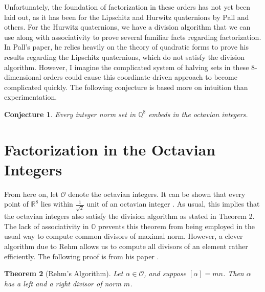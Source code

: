 \documentclass[10pt]{amsart}
\newcommand{\Q}{\mathbb{Q}}
\newcommand{\R}{\mathbb{R}}
\renewcommand{\O}{\mathbb{O}}
\newcommand{\Ord}{\mathcal{O}}
\newcommand{\norm}[1]{\left[#1\right]}
\newtheorem{thm}{Theorem}
\newtheorem{conj}[thm]{Conjecture}
\begin{document}
Unfortunately, the foundation of factorization in these orders has not yet been laid out, as it has been for the Lipschitz and Hurwitz quaternions by Pall and others.  For the Hurwitz quaternions, we have a division algorithm that we can use along with associativity to prove several familiar facts regarding factorization.  In Pall's paper, he relies heavily on the theory of quadratic forms to prove his results regarding the Lipschitz quaternions, which do not satisfy the division algorithm.  However, I imagine the complicated system of halving sets in these $8$-dimensional orders could cause this coordinate-driven approach to become complicated quickly.  The following conjecture is based more on intuition than experimentation.

\begin{conj}
\normalfont
Every integer norm set in $\Q^8$ embeds in the octavian integers.
\end{conj}


\section{Factorization in the Octavian Integers}

From here on, let $\Ord$ denote the octavian integers.  It can be shown that every point of $\R^8$ lies within $\frac{1}{\sqrt{2}}$ unit of an octavian integer \cite{Co46}.  As usual, this implies that the octavian integers also satisfy the division algorithm as stated in Theorem 2.  The lack of associativity in $\O$ prevents this theorem from being employed in the usual way to compute common divisors of maximal norm.  However, a clever algorithm due to Rehm allows us to compute all divisors of an element rather efficiently.  The following proof is from his paper \cite{Re93}.

\begin{thm}[Rehm's Algorithm]
\normalfont
Let $\alpha \in \Ord$, and suppose $\norm{\alpha} = mn$.  Then $\alpha$ has a left and a right divisor of norm $m$.
\end{thm}
\end{document}
